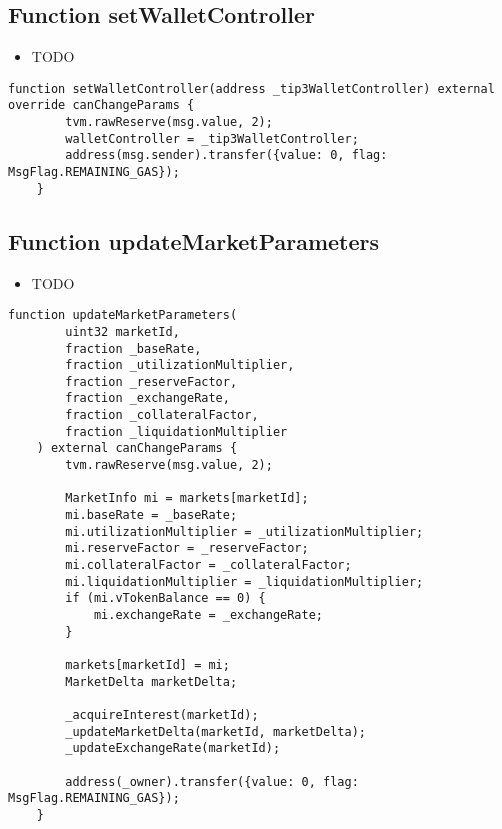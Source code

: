 \subsection{Function setWalletController}

\noindent\begin{itemize}
\item TODO
\end{itemize}

\begin{lstlisting}[firstnumber=492]
    function setWalletController(address _tip3WalletController) external override canChangeParams {
        tvm.rawReserve(msg.value, 2);
        walletController = _tip3WalletController;
        address(msg.sender).transfer({value: 0, flag: MsgFlag.REMAINING_GAS});
    }
\end{lstlisting}

\subsection{Function updateMarketParameters}

\noindent\begin{itemize}
\item TODO
\end{itemize}

\begin{lstlisting}[firstnumber=284]
    function updateMarketParameters(
        uint32 marketId,
        fraction _baseRate,
        fraction _utilizationMultiplier,
        fraction _reserveFactor,
        fraction _exchangeRate,
        fraction _collateralFactor,
        fraction _liquidationMultiplier
    ) external canChangeParams {
        tvm.rawReserve(msg.value, 2);

        MarketInfo mi = markets[marketId];
        mi.baseRate = _baseRate;
        mi.utilizationMultiplier = _utilizationMultiplier;
        mi.reserveFactor = _reserveFactor;
        mi.collateralFactor = _collateralFactor;
        mi.liquidationMultiplier = _liquidationMultiplier;
        if (mi.vTokenBalance == 0) {
            mi.exchangeRate = _exchangeRate;
        }

        markets[marketId] = mi;
        MarketDelta marketDelta;

        _acquireInterest(marketId);
        _updateMarketDelta(marketId, marketDelta);
        _updateExchangeRate(marketId);

        address(_owner).transfer({value: 0, flag: MsgFlag.REMAINING_GAS});
    }
\end{lstlisting}

